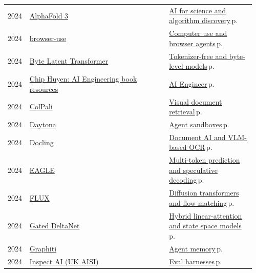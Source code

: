 \documentclass[10pt,a4paper,openany]{report}
\begin{document}
{\begin{longtable}{@{}p{0.07\linewidth}>{\raggedright}p{0.55\linewidth}>{\raggedright\arraybackslash}p{0.34\linewidth}@{}}
2024 & \href{https://github.com/google-deepmind/alphafold3}{AlphaFold 3} & \hyperref[c:embodied-7]{AI for science and algorithm discovery}\,{\color{muted}\scriptsize p.\,\pageref{c:embodied-7}}\\
2024 & \href{https://github.com/browser-use/browser-use}{browser-use} & \hyperref[c:agents-9]{Computer use and browser agents}\,{\color{muted}\scriptsize p.\,\pageref{c:agents-9}}\\
2024 & \href{https://github.com/facebookresearch/blt}{Byte Latent Transformer} & \hyperref[c:arch-9]{Tokenizer-free and byte-level models}\,{\color{muted}\scriptsize p.\,\pageref{c:arch-9}}\\
2024 & \href{https://github.com/chiphuyen/aie-book}{Chip Huyen: AI Engineering book resources} & \hyperref[c:practice-1]{AI Engineer}\,{\color{muted}\scriptsize p.\,\pageref{c:practice-1}}\\
2024 & \href{https://github.com/illuin-tech/colpali}{ColPali} & \hyperref[c:vlm-5]{Visual document retrieval}\,{\color{muted}\scriptsize p.\,\pageref{c:vlm-5}}\\
2024 & \href{https://github.com/daytonaio/daytona}{Daytona} & \hyperref[c:agents-11]{Agent sandboxes}\,{\color{muted}\scriptsize p.\,\pageref{c:agents-11}}\\
2024 & \href{https://github.com/docling-project/docling}{Docling} & \hyperref[c:vlm-4]{Document AI and VLM-based OCR}\,{\color{muted}\scriptsize p.\,\pageref{c:vlm-4}}\\
2024 & \href{https://github.com/SafeAILab/EAGLE}{EAGLE} & \hyperref[c:arch-6]{Multi-token prediction and speculative decoding}\,{\color{muted}\scriptsize p.\,\pageref{c:arch-6}}\\
2024 & \href{https://github.com/black-forest-labs/flux}{FLUX} & \hyperref[c:embodied-5]{Diffusion transformers and flow matching}\,{\color{muted}\scriptsize p.\,\pageref{c:embodied-5}}\\
2024 & \href{https://github.com/NVlabs/GatedDeltaNet}{Gated DeltaNet} & \hyperref[c:arch-4]{Hybrid linear-attention and state space models}\,{\color{muted}\scriptsize p.\,\pageref{c:arch-4}}\\
2024 & \href{https://github.com/getzep/graphiti}{Graphiti} & \hyperref[c:context-4]{Agent memory}\,{\color{muted}\scriptsize p.\,\pageref{c:context-4}}\\
2024 & \href{https://github.com/UKGovernmentBEIS/inspect_ai}{Inspect AI (UK AISI)} & \hyperref[c:evals-0]{Eval harnesses}\,{\color{muted}\scriptsize p.\,\pageref{c:evals-0}}\\

\end{longtable}}
\end{document}
